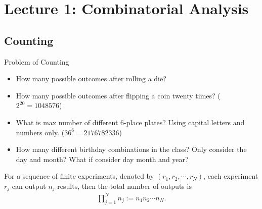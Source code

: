 \section{Lecture 1: Combinatorial Analysis}

\subsection{Counting}
\begin{frame}{Problem of Counting}
    \begin{example}
    \begin{itemize}
        \item  How many possible outcomes after rolling a die?
        \pause
   \item  How many possible outcomes after flipping a coin twenty times?\pause 
   ($2^{20}=1048576
$)
\pause
  \item   What is max number of different 6-place plates? Using capital letters and numbers only.\pause 
  ($36^6=2176782336$)
  \pause
  \item How many different birthday combinations in the class? Only consider the day and month? What if consider day month and year?
    \end{itemize}
    \end{example}
\end{frame}

\begin{frame}{}
    For a sequence of finite experiments, denoted by $(r_1,r_2,\cdots, r_N)$, each experiment $r_j$ can output $n_j$ results, then the total number of outputs is 
\begin{align}
\label{eq:prin of counting}
\prod_{j=1}^Nn_j:=n_1n_2\cdots n_N.
\end{align}
    \et
\end{frame}
